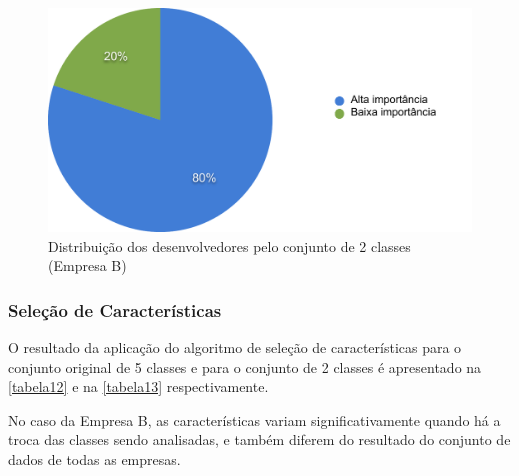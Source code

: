\begin{figure}[h]
	\centering
	\includegraphics[scale=0.45]{figs/empresa_b/imagem-classe-alternativa}
	\caption{\label{fig_12}Distribuição dos desenvolvedores pelo conjunto de 2 classes (Empresa B)}
\end{figure}

\subsubsection{Seleção de Características}
O resultado da aplicação do algoritmo de seleção de características para o conjunto original de 5 classes e para o conjunto de 2 classes é apresentado na \autoref{tabela12} e na \autoref{tabela13} respectivamente.

No caso da Empresa B, as características variam significativamente quando há a troca das classes sendo analisadas, e também diferem do resultado do conjunto de dados de todas as empresas.

